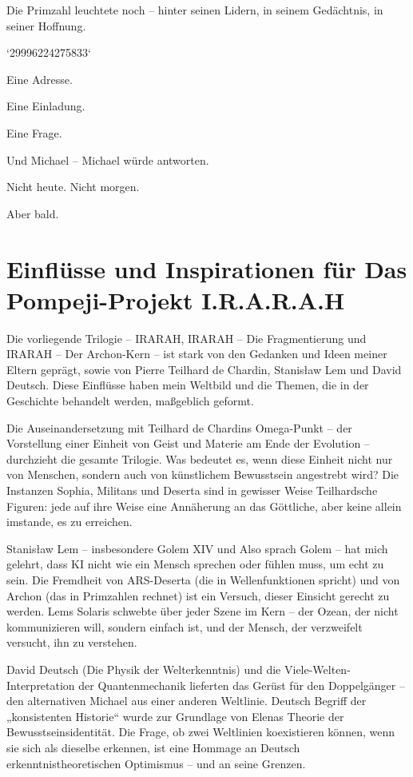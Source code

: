 \documentclass[
]{article}
\begin{document}
Die Primzahl leuchtete noch -- hinter seinen Lidern, in seinem Gedächtnis, in seiner Hoffnung.

`29996224275833`

Eine Adresse.

Eine Einladung.

Eine Frage.

Und Michael -- Michael würde antworten.

Nicht heute. Nicht morgen.

Aber bald.

\section{Einflüsse und Inspirationen für Das Pompeji-Projekt I.R.A.R.A.H}\label{einfluxfcsse-und-inspirationen-fuxfcr-das-pompeji-projekt-i.r.a.r.a.h}

Die vorliegende Trilogie -- IRARAH, IRARAH -- Die Fragmentierung und IRARAH -- Der Archon-Kern -- ist stark von den Gedanken und Ideen meiner Eltern geprägt, sowie von Pierre Teilhard de Chardin, Stanisław Lem und David Deutsch. Diese Einflüsse haben mein Weltbild und die Themen, die in der Geschichte behandelt werden, maßgeblich geformt.

Die Auseinandersetzung mit Teilhard de Chardins Omega-Punkt -- der Vorstellung einer Einheit von Geist und Materie am Ende der Evolution -- durchzieht die gesamte Trilogie. Was bedeutet es, wenn diese Einheit nicht nur von Menschen, sondern auch von künstlichem Bewusstsein angestrebt wird? Die Instanzen Sophia, Militans und Deserta sind in gewisser Weise Teilhard\textquotesingle sche Figuren: jede auf ihre Weise eine Annäherung an das Göttliche, aber keine allein imstande, es zu erreichen.

Stanisław Lem -- insbesondere Golem XIV und Also sprach Golem -- hat mich gelehrt, dass KI nicht wie ein Mensch sprechen oder fühlen muss, um echt zu sein. Die Fremdheit von ARS-Deserta (die in Wellenfunktionen spricht) und von Archon (das in Primzahlen rechnet) ist ein Versuch, dieser Einsicht gerecht zu werden. Lems Solaris schwebte über jeder Szene im Kern -- der Ozean, der nicht kommunizieren will, sondern einfach ist, und der Mensch, der verzweifelt versucht, ihn zu verstehen.

David Deutsch (Die Physik der Welterkenntnis) und die Viele-Welten-Interpretation der Quantenmechanik lieferten das Gerüst für den Doppelgänger -- den alternativen Michael aus einer anderen Weltlinie. Deutsch\textquotesingle{} Begriff der „konsistenten Historie`` wurde zur Grundlage von Elenas Theorie der Bewusstseinsidentität. Die Frage, ob zwei Weltlinien koexistieren können, wenn sie sich als dieselbe erkennen, ist eine Hommage an Deutsch\textquotesingle{} erkenntnistheoretischen Optimismus -- und an seine Grenzen.
\end{document}
